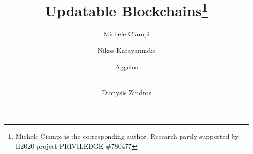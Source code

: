 \title{Updatable Blockchains\thanks{Michele Ciampi is the corresponding author. 
Research partly supported by H2020 project PRIVILEDGE \#780477}}



\author{Michele Ciampi 
	\and   Nikos Karayannidis
	\and Aggelos  
        \and \\ Dionysis Zindros 
       }



\maketitle



